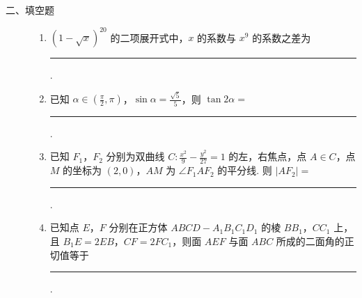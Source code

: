 \begin{description}

    \item[二、填空题]

    \begin{enumerate}[leftmargin=5pt]

      \addtocounter{enumi}{+12}

        \item \((1 - \sqrt{x})^{20}\) 的二项展开式中，\(x\) 的系数与 \(x^9\) 的系数之差为\rule[-0.3ex]{3em}{0.4pt}.

        \item 已知 \(\alpha \in \left(\frac{\pi}{2}, \pi\right)\)，\(\sin \alpha = \frac{\sqrt{5}}{5}\)，则 \(\tan 2\alpha = \)\rule[-0.3ex]{3em}{0.4pt}.

        \item 已知 \(F_{1}\)，\(F_{2}\) 分别为双曲线 \(C: \frac{x^{2}}{9} - \frac{y^{2}}{27} = 1\) 的左，右焦点，点 \(A \in C\)，点 \(M\) 的坐标为 \((2,0)\)，\(AM\) 为 \(\angle F_{1}AF_{2}\) 的平分线. 则 \(|AF_{2}| = \)\rule[-0.3ex]{3em}{0.4pt}.

        \item 已知点 \(E\)，\(F\) 分别在正方体 \(ABCD - A_{1}B_{1}C_{1}D_{1}\) 的棱 \(BB_{1}\)，\(CC_{1}\) 上，且 \(B_{1}E = 2EB\)，\(CF = 2FC_{1}\)，则面 \(AEF\) 与面 \(ABC\) 所成的二面角的正切值等于\rule[-0.3ex]{3em}{0.4pt}.

    \end{enumerate}

\end{description}

